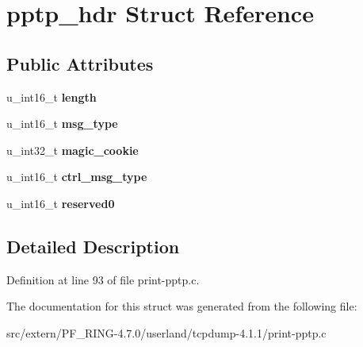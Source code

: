 \hypertarget{structpptp__hdr}{
\section{pptp\_\-hdr Struct Reference}
\label{structpptp__hdr}
}
\subsection*{Public Attributes}
\begin{DoxyCompactItemize}
\item 
\hypertarget{structpptp__hdr_a5d48eaae5eaf58b763672279a7d96f33}{
u\_\-int16\_\-t {\bfseries length}}
\label{structpptp__hdr_a5d48eaae5eaf58b763672279a7d96f33}

\item 
\hypertarget{structpptp__hdr_a3a61e159129814e22c089917e9fbcf7b}{
u\_\-int16\_\-t {\bfseries msg\_\-type}}
\label{structpptp__hdr_a3a61e159129814e22c089917e9fbcf7b}

\item 
\hypertarget{structpptp__hdr_a149258d3ea83fa91432ddfd938766bd7}{
u\_\-int32\_\-t {\bfseries magic\_\-cookie}}
\label{structpptp__hdr_a149258d3ea83fa91432ddfd938766bd7}

\item 
\hypertarget{structpptp__hdr_aa310c8668649f7f1d95a895da7b95c4b}{
u\_\-int16\_\-t {\bfseries ctrl\_\-msg\_\-type}}
\label{structpptp__hdr_aa310c8668649f7f1d95a895da7b95c4b}

\item 
\hypertarget{structpptp__hdr_af217c9a2296e4ae2473020c05252cfd1}{
u\_\-int16\_\-t {\bfseries reserved0}}
\label{structpptp__hdr_af217c9a2296e4ae2473020c05252cfd1}

\end{DoxyCompactItemize}


\subsection{Detailed Description}


Definition at line 93 of file print-\/pptp.c.



The documentation for this struct was generated from the following file:\begin{DoxyCompactItemize}
\item 
src/extern/PF\_\-RING-\/4.7.0/userland/tcpdump-\/4.1.1/print-\/pptp.c\end{DoxyCompactItemize}
